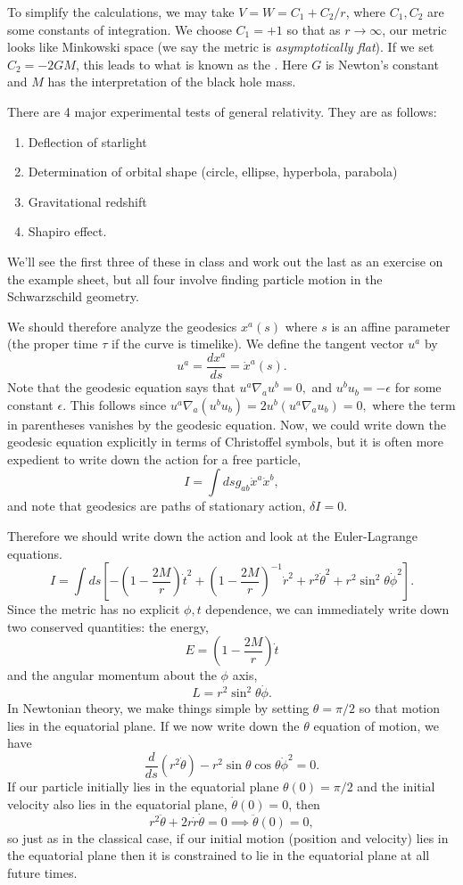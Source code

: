 To simplify the calculations, we may take $V=W=C_1+C_2/r$, where $C_1,C_2$ are some constants of integration. We choose $C_1=+1$ so that as $r\to\infty$, our metric looks like Minkowski space (we say the metric is \emph{asymptotically flat}). If we set $C_2=-2GM$, this leads to what is known as the . Here $G$ is Newton's constant and $M$ has the interpretation of the black hole mass. %

There are 4 major experimental tests of general relativity. They are as follows:
\begin{enumerate}
    \item Deflection of starlight
    \item Determination of orbital shape (circle, ellipse, hyperbola, parabola)
    \item Gravitational redshift
    \item Shapiro effect.
\end{enumerate}
We'll see the first three of these in class and work out the last as an exercise on the example sheet, but all four involve finding particle motion in the Schwarzschild geometry.

We should therefore analyze the geodesics $x^a(s)$ where $s$ is an affine parameter (the proper time $\tau$ if the curve is timelike). We define the tangent vector $u^a$ by
$$u^a=\frac{dx^a}{ds}=\dot x^a(s).$$
Note that the geodesic equation says that $u^a \nabla_a u^b=0,$ and $u^b u_b=-\epsilon$ for some constant $\epsilon.$ This follows since
$u^a\nabla_a(u^b u_b)=2u^b (u^a \nabla_a u_b)=0,$
where the term in parentheses vanishes by the geodesic equation. Now, we could write down the geodesic equation explicitly in terms of Christoffel symbols, but it is often more expedient to write down the action for a free particle,
$$I=\int ds g_{ab}\dot x^a \dot x^b,$$
and note that geodesics are paths of stationary action, $\delta I=0$.

Therefore we should write down the action and look at the Euler-Lagrange equations.
$$I=\int ds \left[-\left(1-\frac{2M}{r}\right)\dot t^2 + \left(1-\frac{2M}{r}\right)^{-1} \dot r^2 +r^2 \dot \theta^2 +r^2\sin^2\theta \dot \phi^2\right].$$
Since the metric has no explicit $\phi, t$ dependence, we can immediately write down two conserved quantities:
the energy, $$E=\left(1-\frac{2M}{r}\right)\dot t$$
and the angular momentum about the $\phi$ axis,
$$L=r^2 \sin^2\theta \dot \phi.$$
In Newtonian theory, we make things simple by setting $\theta=\pi/2$ so that motion lies in the equatorial plane. If we now write down the $\theta$ equation of motion, we have
$$\frac{d}{ds}(r^2\dot \theta)-r^2 \sin\theta\cos\theta \dot \phi^2=0.$$
If our particle initially lies in the equatorial plane $\theta(0)=\pi/2$ and the initial velocity also lies in the equatorial plane, $\dot \theta(0)=0$, then 
$$r^2 \ddot \theta+2r \dot r \dot\theta =0 \implies \ddot\theta(0)=0,$$
so just as in the classical case, if our initial motion (position and velocity) lies in the equatorial plane then it is constrained to lie in the equatorial plane at all future times.